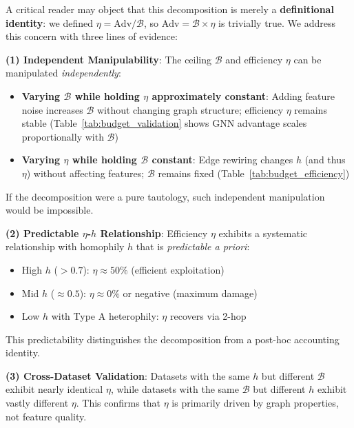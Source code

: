 \begin{remark}
\label{rem:tautology}
A critical reader may object that this decomposition is merely a \textbf{definitional identity}: we defined $\eta = \text{Adv}/\mathcal{B}$, so $\text{Adv} = \mathcal{B} \times \eta$ is trivially true. We address this concern with three lines of evidence:

\textbf{(1) Independent Manipulability}: The ceiling $\mathcal{B}$ and efficiency $\eta$ can be manipulated \textit{independently}:
\begin{itemize}
    \item \textbf{Varying $\mathcal{B}$ while holding $\eta$ approximately constant}: Adding feature noise increases $\mathcal{B}$ without changing graph structure; efficiency $\eta$ remains stable (Table~\ref{tab:budget_validation} shows GNN advantage scales proportionally with $\mathcal{B}$)
    \item \textbf{Varying $\eta$ while holding $\mathcal{B}$ constant}: Edge rewiring changes $h$ (and thus $\eta$) without affecting features; $\mathcal{B}$ remains fixed (Table~\ref{tab:budget_efficiency})
\end{itemize}
If the decomposition were a pure tautology, such independent manipulation would be impossible.

\textbf{(2) Predictable $\eta$-$h$ Relationship}: Efficiency $\eta$ exhibits a systematic relationship with homophily $h$ that is \textit{predictable a priori}:
\begin{itemize}
    \item High $h$ ($> 0.7$): $\eta \approx 50\%$ (efficient exploitation)
    \item Mid $h$ ($\approx 0.5$): $\eta \approx 0\%$ or negative (maximum damage)
    \item Low $h$ with Type A heterophily: $\eta$ recovers via 2-hop
\end{itemize}
This predictability distinguishes the decomposition from a post-hoc accounting identity.

\textbf{(3) Cross-Dataset Validation}: Datasets with the same $h$ but different $\mathcal{B}$ exhibit nearly identical $\eta$, while datasets with the same $\mathcal{B}$ but different $h$ exhibit vastly different $\eta$. This confirms that $\eta$ is primarily driven by graph properties, not feature quality.
\end{remark}

